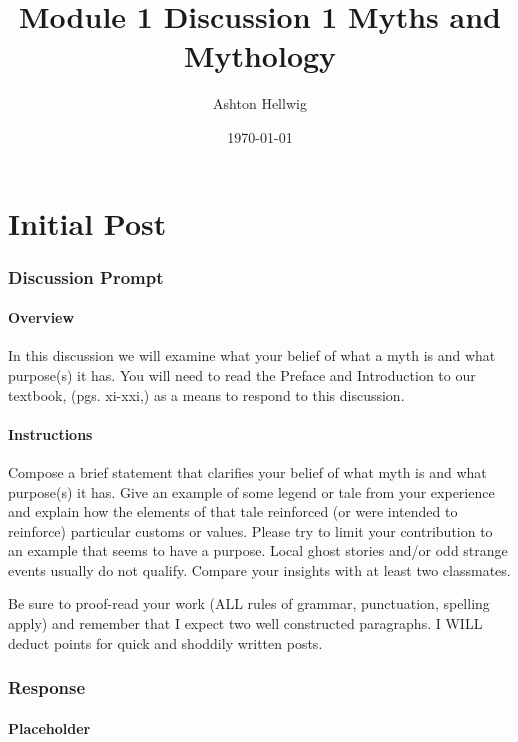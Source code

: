 \documentclass[12pt]{article}
\title{%
    Module 1 Discussion 1%
    \large{Myths and Mythology}
  }
\author{Ashton Hellwig}
\date{\today}
\theoremstyle{definition}
\theoremstyle{plain}
\begin{document}
  \maketitle
  \tableofcontents
  \lstlistoflistings
  \newpage


  \part{Initial Post}

    \section{Discussion Prompt}
      \begin{mdframed}
        \subsection{Overview}
          In this discussion we will examine what your belief of what a myth is
          and what purpose(s) it has.  You will need to read the Preface and
          Introduction to our textbook, (pgs. xi-xxi,) as a means to respond to
          this discussion.

        \subsection{Instructions}
          Compose a brief statement that clarifies your belief of what myth is
          and what purpose(s) it has. Give an example of some legend or tale
          from your experience and explain how the elements of that tale
          reinforced (or were intended to reinforce) particular customs or
          values. Please try to limit your contribution to an example that
          seems to have a purpose. Local ghost stories and/or odd strange events
          usually do not qualify. Compare your insights with at least two
          classmates.

          Be sure to proof-read your work (ALL rules of grammar, punctuation,
          spelling apply) and remember that I expect two well constructed
          paragraphs. I WILL deduct points for quick and shoddily written posts.
      \end{mdframed}

    \section{Response}
      \subsection{Placeholder}
\end{document}
